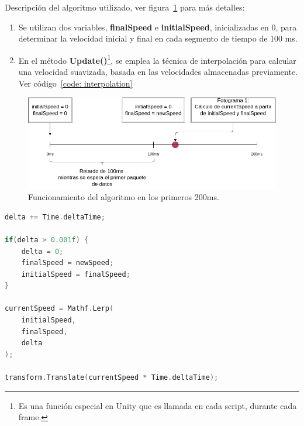 Descripción del algoritmo utilizado, ver figura~\ref{fig: interpolation-algorithm} para más detalles:
\begin{enumerate}
    \item Se utilizan dos variables, \textbf{finalSpeed} e \textbf{initialSpeed}, inicializadas en 0, para determinar la velocidad inicial y final en cada segmento de tiempo de 100 ms.
    \item En el método \textbf{Update()}\footnote{Es una función especial en Unity que es llamada en cada script, durante cada frame.}, se emplea la técnica de interpolación para calcular una velocidad suavizada, basada en las velocidades almacenadas previamente. Ver código~\ref{code: interpolation}
\end{enumerate} 

\begin{figure}[ht]
    \centering
    \includegraphics[scale=0.4]{images/interpolation-algorithm.png}
    \caption{Funcionamiento del algoritmo en los primeros 200ms.}
    \label{fig: interpolation-algorithm}
\end{figure}

\begin{center}
\begin{minipage}{0.8\textwidth}
\begin{lstlisting}[language=c, label={code: interpolation}, caption={Controlador de movimiento.}]
delta += Time.deltaTime;
 
if(delta > 0.001f) {
    delta = 0;
    finalSpeed = newSpeed;
    initialSpeed = finalSpeed;
}

currentSpeed = Mathf.Lerp( 
    initialSpeed, 
    finalSpeed, 
    delta
);

transform.Translate(currentSpeed * Time.deltaTime);
\end{lstlisting}
\end{minipage}
\end{center}



